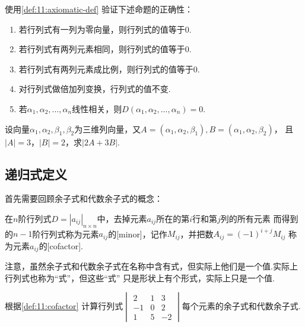 \begin{example} \label{ex:11:axiomatic-def}
    使用\autoref{def:11:axiomatic-def} 验证下述命题的正确性：
    \begin{enumerate}
        \item 若行列式有一列为零向量，则行列式的值等于$0$.

        \item 若行列式有两列元素相同，则行列式的值等于$0$.

        \item 若行列式有两列元素成比例，则行列式的值等于$0$.

        \item 对行列式做倍加列变换，行列式的值不变.

        \item 若$\alpha_1,\alpha_2,\ldots,\alpha_n$线性相关，则$D(\alpha_1,\alpha_2,\ldots,\alpha_n)=0$.
    \end{enumerate}
\end{example}

\begin{example} \label{ex:11:axiomatic-def-2}
    设向量$\alpha_1,\alpha_2,\beta_1,\beta_2$为三维列向量，又$A=(\alpha_1,\alpha_2,\beta_1),B=(\alpha_1,\alpha_2,\beta_2)$，
    且$|A|=3$，$|B|=2$，求$|2A+3B|$.
\end{example}

\subsection{递归式定义}
首先需要回顾余子式和代数余子式的概念：
\begin{definition} \label{def:11:cofactor}
    在$n$阶行列式$D=|a_{ij}|_{n \times n}$中，去掉元素$a_{ij}$所在的第$i$行和第$j$列的所有元素
    而得到的$n-1$阶行列式称为元素$a_{ij}$的[minor]，记作$M_{ij}$，并把数$A_{ij}=(-1)^{i+j}M_{ij}$
    称为元素$a_{ij}$的[cofactor].
\end{definition}
注意，虽然余子式和代数余子式在名称中含有式，但实际上他们是一个值.实际上行列式也称为``式''，但这些``式''
只是形状上有个形式，实际上只是一个值.
\begin{example} \label{ex:11:cofactor}
    根据\autoref{def:11:cofactor} 计算行列式$\begin{vmatrix}
        2 & 1 & 3 \\
        -1 & 0 & 2 \\
        1 & 5 & -2
    \end{vmatrix}$每个元素的余子式和代数余子式.
\end{example}


